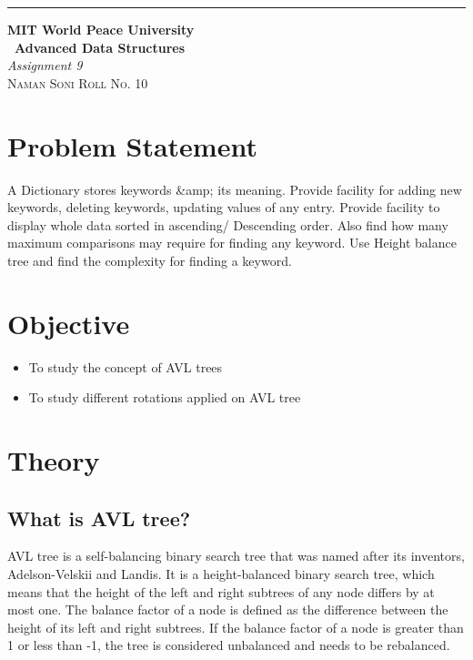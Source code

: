 \documentclass{article}
\begin{document}
\begin{titlepage} %
	
	\raggedleft\rule{1pt}{\textheight} %
	\hspace{0.05\textwidth} %
	\parbox[b]{0.75\textwidth}
	{ %
		
		{\Huge\bfseries MIT World Peace University \\[0.5\baselineskip] \ Advanced Data Structures}\\[2\baselineskip] %
		{\large\textit{Assignment 9}}\\[4\baselineskip] %
		{\Large\textsc{Naman Soni Roll No. 10}} %
		
		\vspace{0.5\textheight} %
	}
	
\end{titlepage}
\tableofcontents
\pagebreak
\section{\textbf{Problem Statement}}
A Dictionary stores keywords &amp; its meaning. Provide facility for adding new keywords, deleting
keywords, updating values of any entry. Provide facility to display whole data sorted in
ascending/ Descending order. Also find how many maximum comparisons may require for
finding any keyword. Use Height balance tree and find the complexity for finding a keyword.
\section{\textbf{Objective}}
\begin{itemize}
    \item To study the concept of AVL trees
    \item To study different rotations applied on AVL tree
\end{itemize}
\section{\textbf{Theory}}
\subsection{\textbf{What is AVL tree?}}
AVL tree is a self-balancing binary search tree that was named after its inventors, Adelson-Velskii and Landis. It is a height-balanced binary search tree, which means that the height of the left and right subtrees of any node differs by at most one. The balance factor of a node is defined as the difference between the height of its left and right subtrees. If the balance factor of a node is greater than 1 or less than -1, the tree is considered unbalanced and needs to be rebalanced.\\
\end{document}
